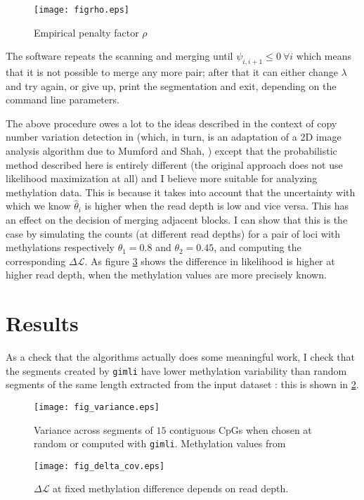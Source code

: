 \documentclass[12pt]{amsart}
\newcommand{\lik}{\ensuremath{\mathcal{L}}}
\newcommand{\gimli}{\texttt{gimli}}
\begin{document}
\begin{figure}
\texttt{[image: figrho.eps]}
\caption{Empirical penalty factor $\rho$}
\label{figrho}
\end{figure}

The software repeats the scanning and merging until $\psi_{i,i+1} \leq 0\ \forall i$ 
which means that it is not possible to 
merge any more pair; after that it can either change $\lambda$ and try again, 
or give up, print the segmentation and exit, depending on the command line parameters.

The above procedure owes a lot to the ideas described 
in the context of copy number variation detection in \cite{vega} 
(which, in turn, is an adaptation 
of a 2D image analysis algorithm due to Mumford and Shah, 
\cite{mumfordshah}) except that the probabilistic method  described
here is entirely different (the original approach does not use likelihood
maximization at all) and I believe more suitable for analyzing methylation data.
This is because it takes into account that the
uncertainty with which we know $\hat{\theta}_i$ is higher when the read depth 
is low and vice versa.
This has an effect on the decision of merging adjacent blocks. I can show that 
this is the case by simulating
the counts (at different read depths) for a pair of loci with 
methylations respectively $\theta_1=0.8$ and $\theta_2=0.45$,
and computing the corresponding $\Delta  \lik$.  
As figure \ref{fig_delta_cov} shows the difference in likelihood is higher 
at higher read depth, when the methylation values are more precisely known.

\section{Results}

As a check that the algorithms actually does some meaningful work, I check that 
the segments created by \gimli{} have lower methylation
variability than random segments of the same length extracted from the 
input dataset : this is shown in \ref{fig_variance}.

\begin{figure}
\texttt{[image: fig\_variance.eps]}
\caption{Variance across segments of $15$ contiguous CpGs when chosen at 
random or 
computed with \gimli{}. Methylation values from }
\label{fig_variance}
\end{figure}

\begin{figure}
\texttt{[image: fig\_delta\_cov.eps]}
\caption{$\Delta  \lik$ at fixed methylation difference depends on read depth.}
\label{fig_delta_cov}
\end{figure}
\end{document}
